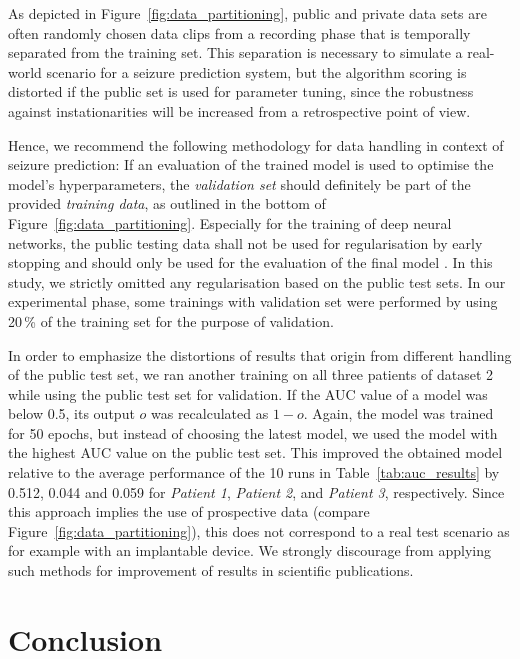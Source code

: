 \documentclass[a4paper, conference]{IEEEtran}
\begin{document}
As depicted in Figure~\ref{fig:data_partitioning}, public and private data sets are often randomly chosen data clips from a recording phase that is temporally separated from the training set. This separation is necessary to simulate a real-world scenario for a seizure prediction system, but the algorithm scoring is distorted if the public set is used for parameter tuning, since the robustness against instationarities will be increased from a retrospective point of view.

Hence, we recommend the following methodology for data handling in context of seizure prediction: If an evaluation of the trained model is used to optimise the model's hyperparameters, the \textit{validation set} should definitely be part of the provided \textit{training data}, as outlined in the bottom of Figure~\ref{fig:data_partitioning}. Especially for the training of deep neural networks, the public testing data shall not be used for regularisation by early stopping and should only be used for the evaluation of the final model \cite{Korshunova2018}. In this study, we strictly omitted any regularisation based on the public test sets. In our experimental phase, some trainings with validation set were performed by using 20\,\% of the training set for the purpose of validation. 

In order to emphasize the distortions of results that origin from different handling of the public test set, we ran another training on all three patients of dataset 2 while using the public test set for validation. If the AUC value of a model was below 0.5, its output $o$ was recalculated as $1 - o$. Again, the model was trained for 50 epochs, but instead of choosing the latest model, we used the model with the highest AUC value on the public test set. This improved the obtained model relative to the average performance of the 10 runs in Table~\ref{tab:auc_results} by 0.512, 0.044 and 0.059 for \textit{Patient 1}, \textit{Patient 2}, and \textit{Patient 3}, respectively. Since this approach implies the use of prospective data (compare Figure~\ref{fig:data_partitioning}), this does not correspond to a real test scenario as for example with an implantable device. We strongly discourage from applying such methods for improvement of results in scientific publications.


\section{Conclusion}
\label{sec:conclusion}
\end{document}
